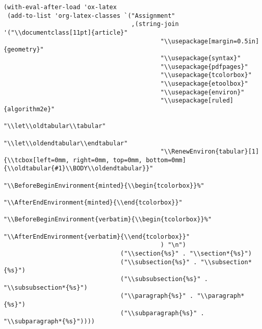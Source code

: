 \documentclass[11pt]{article}
\let\oldtabular\tabular
\let\oldendtabular\endtabular
\begin{document}
\begin{verbatim}
(with-eval-after-load 'ox-latex
 (add-to-list 'org-latex-classes `("Assignment"
                                   ,(string-join '("\\documentclass[11pt]{article}"
                                           "\\usepackage[margin=0.5in]{geometry}"
                                           "\\usepackage{syntax}"
                                           "\\usepackage{pdfpages}"
                                           "\\usepackage{tcolorbox}"
                                           "\\usepackage{etoolbox}"
                                           "\\usepackage{environ}"
                                           "\\usepackage[ruled]{algorithm2e}"
                                           "\\let\\oldtabular\\tabular"
                                           "\\let\\oldendtabular\\endtabular"
                                           "\\RenewEnviron{tabular}[1]{\\tcbox[left=0mm, right=0mm, top=0mm, bottom=0mm]{\\oldtabular{#1}\\BODY\\oldendtabular}}"
                                           "\\BeforeBeginEnvironment{minted}{\\begin{tcolorbox}}%"
                                           "\\AfterEndEnvironment{minted}{\\end{tcolorbox}}"
                                           "\\BeforeBeginEnvironment{verbatim}{\\begin{tcolorbox}}%"
                                           "\\AfterEndEnvironment{verbatim}{\\end{tcolorbox}}"
                                           ) "\n")
                                ("\\section{%s}" . "\\section*{%s}")
                                ("\\subsection{%s}" . "\\subsection*{%s}")
                                ("\\subsubsection{%s}" . "\\subsubsection*{%s}")
                                ("\\paragraph{%s}" . "\\paragraph*{%s}")
                                ("\\subparagraph{%s}" . "\\subparagraph*{%s}"))))


\end{verbatim}
\end{document}
